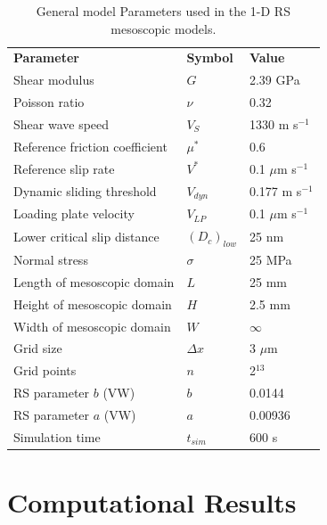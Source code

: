 \documentclass[draft]{agujournal2019}
\begin{document}
\begin{table}[ht]
	\centering
	\caption{General model Parameters used in the 1-D RS mesoscopic models.}
	\begin{tabular}{ m{5cm} m{2cm} m{4cm}} 
		\hline  
		\bf{Parameter} 			& \bf{Symbol} 		& \bf{Value}	\\
		Shear modulus  			& $G$  		 	& 2.39 GPa		\\
		Poisson ratio  			& $\nu$  	 	& 0.32 		\\
		Shear wave speed		& $V_{S}$      		& 1330 m s$^{-1}$	\\
		Reference friction coefficient	& $\mu^{*}$	        & 0.6	\\
		Reference slip rate  		& $V^{*}$     		&  0.1 $\mu$m s$^{-1}$\\
		Dynamic sliding threshold   	& $V_{dyn}$  		& 0.177 m s$^{-1}$ \\
		Loading plate velocity  	& $V_{LP}$     		&  0.1 $\mu$m s$^{-1}$\\
		Lower critical slip distance 	& $\left(D_{c}\right)_{low}$    &  25 nm\\
		Normal stress 			& $\sigma$  		&  25 MPa \\
		Length of mesoscopic domain 	&   $L$  		& 25 mm\\
		Height of mesoscopic domain 	&   $H$  		& 2.5 mm\\
		Width of mesoscopic domain 	&   $W$   		& $\infty$\\
		Grid size 			& $\Delta x$ 		& 3 $\mu$m \\
		Grid points 			& $n$ 			& 2$^{13}$ \\
		RS parameter $b$ (VW)  		& $b$ 			& 0.0144  \\
		RS parameter $a$ (VW)  		& $a$ 			& 0.00936  \\
	    Simulation time 			& $t_{sim}$ 		& 600 s  \\
		\hline  	
	\end{tabular}
	\label{table1}
\end{table}

\section{Computational Results}
\end{document}
